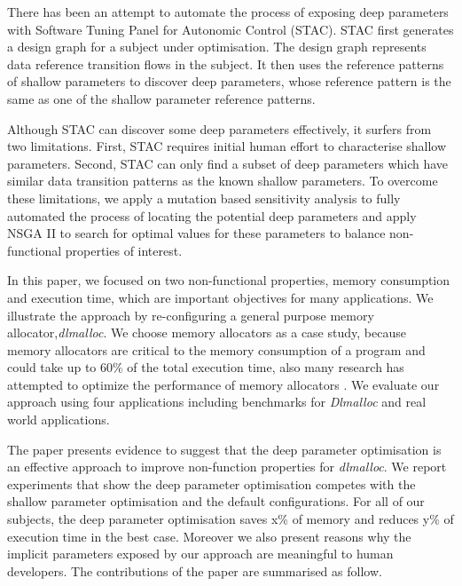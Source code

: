 There has been an attempt to automate the process of exposing deep parameters with Software Tuning Panel for Autonomic Control (STAC)\cite{Brake:2008:ADS:1370018.1370031}. STAC first generates a design graph for a subject under optimisation. The design graph represents data reference transition flows in the subject. It then uses the reference patterns of shallow parameters to discover deep parameters, whose reference pattern is the same as one of the shallow parameter reference patterns. 

Although STAC can discover some deep parameters effectively, it surfers from two limitations. First, STAC requires initial human effort to characterise shallow parameters. Second, STAC can only find a subset of deep parameters which have similar data transition patterns as the known shallow parameters. To overcome these limitations, we apply a mutation based sensitivity analysis to fully automated the process of locating the potential deep parameters and apply NSGA II to search for optimal values for these parameters to balance non-functional properties of interest. 

In this paper, we focused on two non-functional properties, memory consumption and execution time, which are important objectives for many applications. We illustrate the approach by re-configuring a general purpose memory allocator,\emph{dlmalloc}. We choose memory allocators as a case study, because memory allocators are critical to the memory consumption of a program and could take up to 60\% of the total execution time\cite{Zorn:1992:EMS:142181.142200}, also many research has attempted to optimize the performance of memory allocators \cite{Risco-Martin:2009:ODM:1569901.1570116,RiscoMartin2010572}. We evaluate our approach using four applications including benchmarks for \emph{Dlmalloc} and real world applications.

The paper presents evidence to suggest that the deep parameter optimisation is an effective approach to improve non-function properties for \emph{dlmalloc}. 
We report experiments that show the deep parameter optimisation competes with the shallow parameter optimisation and the default configurations. For all of our subjects, the deep parameter optimisation saves x\% of memory and reduces y\% of execution time in the best case. Moreover we also present reasons why the implicit parameters exposed by our approach are meaningful to human developers. The contributions of the paper are summarised as follow.


